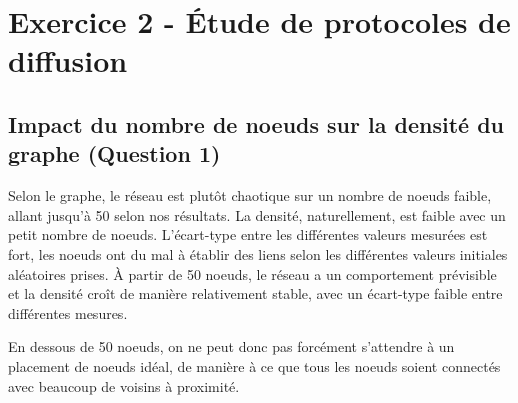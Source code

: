 \documentclass[a4paper]{article}
\begin{document}
\section{Exercice 2 - Étude de protocoles de diffusion}
\subsection{Impact du nombre de noeuds sur la densité du
  graphe (Question 1)}
\begin{minipage}{0.6\textwidth}
  Selon le graphe, le réseau est plutôt chaotique sur un nombre de
  noeuds faible, allant jusqu'à 50 selon nos résultats. La densité,
  naturellement, est faible avec un petit nombre de noeuds. L'écart-type
  entre les différentes valeurs mesurées est fort, les noeuds ont du
  mal à établir des liens selon les différentes valeurs
  initiales aléatoires prises. À partir de 50 noeuds, le réseau a un
  comportement prévisible et la densité croît de manière relativement
  stable, avec un écart-type faible entre différentes mesures.

  En dessous de 50 noeuds, on ne peut donc pas forcément s'attendre à
  un placement de noeuds idéal, de manière à ce que tous les noeuds
  soient connectés avec beaucoup de voisins à proximité.
  \vfill
\end{minipage}%
\hfill
\end{document}
